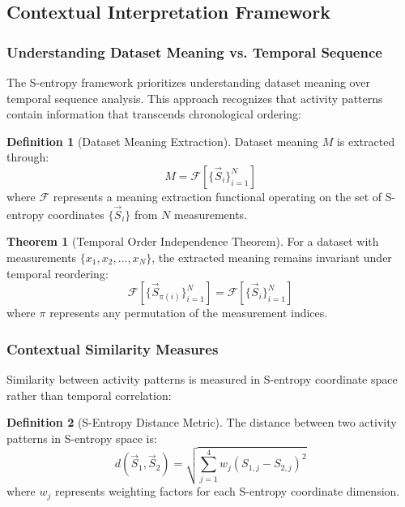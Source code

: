 \documentclass[12pt,a4paper]{article}
\theoremstyle{definition}
\newtheorem{definition}{Definition}[section]
\newtheorem{theorem}{Theorem}[section]
\begin{document}
\subsection{Contextual Interpretation Framework}

\subsubsection{Understanding Dataset Meaning vs. Temporal Sequence}

The S-entropy framework prioritizes understanding dataset meaning over temporal sequence analysis. This approach recognizes that activity patterns contain information that transcends chronological ordering:

\begin{definition}[Dataset Meaning Extraction]
Dataset meaning $M$ is extracted through:
\begin{equation}
M = \mathcal{F}[\{\vec{S}_i\}_{i=1}^N]
\end{equation}
where $\mathcal{F}$ represents a meaning extraction functional operating on the set of S-entropy coordinates $\{\vec{S}_i\}$ from $N$ measurements.
\end{definition}

\begin{theorem}[Temporal Order Independence Theorem]
For a dataset with measurements $\{x_1, x_2, \ldots, x_N\}$, the extracted meaning remains invariant under temporal reordering:
\begin{equation}
\mathcal{F}[\{\vec{S}_{\pi(i)}\}_{i=1}^N] = \mathcal{F}[\{\vec{S}_i\}_{i=1}^N]
\end{equation}
where $\pi$ represents any permutation of the measurement indices.
\end{theorem}

\subsubsection{Contextual Similarity Measures}

Similarity between activity patterns is measured in S-entropy coordinate space rather than temporal correlation:

\begin{definition}[S-Entropy Distance Metric]
The distance between two activity patterns in S-entropy space is:
\begin{equation}
d(\vec{S}_1, \vec{S}_2) = \sqrt{\sum_{j=1}^{4} w_j (S_{1,j} - S_{2,j})^2}
\end{equation}
where $w_j$ represents weighting factors for each S-entropy coordinate dimension.
\end{definition}
\end{document}
